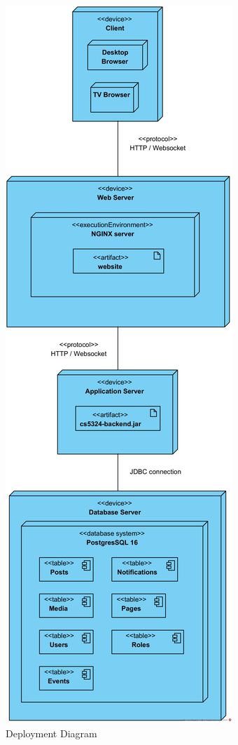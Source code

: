 \documentclass{article}
\begin{document}
\begin{figure}[H]
    \centering
    \includegraphics[width=.38\textwidth]{images/Deployment_Diagram.png}
    \centering
    \caption{Deployment Diagram}
\end{figure}
\end{document}
